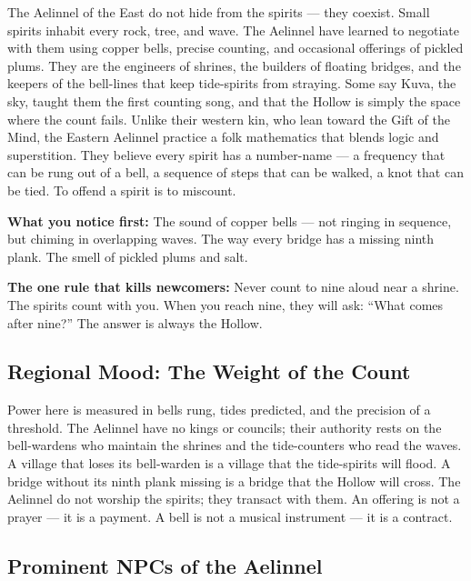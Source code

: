 \vspace{2mm}
\begin{tcolorbox}[colback=black!3,colframe=blue!60!black,title={Theme \& Atmosphere},breakable]
The Aelinnel of the East do not hide from the spirits --- they coexist. Small spirits inhabit every rock, tree, and wave. The Aelinnel have learned to negotiate with them using copper bells, precise counting, and occasional offerings of pickled plums. They are the engineers of shrines, the builders of floating bridges, and the keepers of the bell-lines that keep tide-spirits from straying. Some say Kuva, the sky, taught them the first counting song, and that the Hollow is simply the space where the count fails. Unlike their western kin, who lean toward the Gift of the Mind, the Eastern Aelinnel practice a folk mathematics that blends logic and superstition. They believe every spirit has a number-name --- a frequency that can be rung out of a bell, a sequence of steps that can be walked, a knot that can be tied. To offend a spirit is to miscount.

\vspace{2mm}
\textbf{What you notice first:} The sound of copper bells --- not ringing in sequence, but chiming in overlapping waves. The way every bridge has a missing ninth plank. The smell of pickled plums and salt.

\textbf{The one rule that kills newcomers:} Never count to nine aloud near a shrine. The spirits count with you. When you reach nine, they will ask: ``What comes after nine?'' The answer is always the Hollow.
\end{tcolorbox}

\subsection*{Regional Mood: The Weight of the Count}

Power here is measured in bells rung, tides predicted, and the precision of a threshold. The Aelinnel have no kings or councils; their authority rests on the bell-wardens who maintain the shrines and the tide-counters who read the waves. A village that loses its bell-warden is a village that the tide-spirits will flood. A bridge without its ninth plank missing is a bridge that the Hollow will cross. The Aelinnel do not worship the spirits; they transact with them. An offering is not a prayer --- it is a payment. A bell is not a musical instrument --- it is a contract.

\subsection*{Prominent NPCs of the Aelinnel}
\label{sec:aelinnel-npcs}

